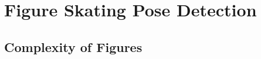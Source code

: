 

\chapter{Figure Skating Pose Detection} %

\label{figureskating} %



\section{Complexity of Figures}

